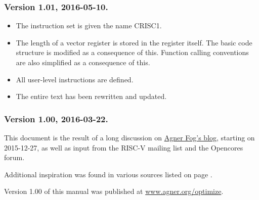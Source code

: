 \documentclass[forwardcom.tex]{subfiles}
\begin{document}
\subsubsection{Version 1.01, 2016-05-10.}
\begin{itemize}
\item The instruction set is given the name CRISC1.
\item The length of a vector register is stored in the register itself. The basic code structure is modified as a consequence of this. Function calling conventions are also simplified as a consequence of this.
\item All user-level instructions are defined.
\item The entire text has been rewritten and updated.
\end{itemize}

\subsubsection{Version 1.00, 2016-03-22.}
This document is the result of a long discussion on 
\href{http://www.agner.org/optimize/blog/read.php?i=421}{Agner Fog's blog}, starting on 2015-12-27, as well as input from the RISC-V mailing list and the Opencores forum.
\vv

Additional inspiration was found in various sources listed on page \pageref{referencesToIntroduction}. 
\vv

Version 1.00 of this manual was published at 
\href{http://www.agner.org/optimize}{www.agner.org/optimize}.
\end{document}
